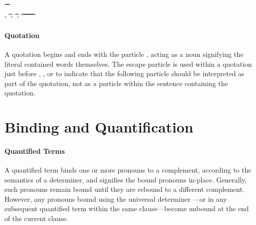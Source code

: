 \begin{ebnf}
	 \is {} 
	\\
	 \is {} 
	\altLine {}  
	\altLine {}  
	\\
	 \is {}
	\altLine {}
	\altLine {}
	\altLine {}
	\altLine {}  
	\\
	 \is {}  
	\\
	 \is {} \alt {}
	\altLine {}  
	\\
	 \is \t{}  \t{}
	\\
	 \is {} - \t{} - \t{} - \t{}
	\altLine \t{} \t{}
	\altLine \t{} \t{}
	\altLine \t{} \t{}
\end{ebnf}


\paragraph{Quotation} A quotation begins and ends with the particle ,
acting as a noun signifying the literal contained words themselves. The escape
particle  is used within a quotation just before ,
, or  to indicate that the following particle should be
interpreted as part of the quotation, not as a particle within the sentence
containing the quotation.


\section{Binding and Quantification} \label{sec:binding}

\paragraph{Quantified Terms} A quantified term binds one or more pronouns to a
complement, according to the semantics of a determiner, and signifies the bound
pronouns in-place. Generally, such pronouns remain bound until they are rebound
to a different complement. However, any pronouns bound using the universal
determiner ---or in any subsequent quantified term within the same
clause---become unbound at the end of the current clause.


